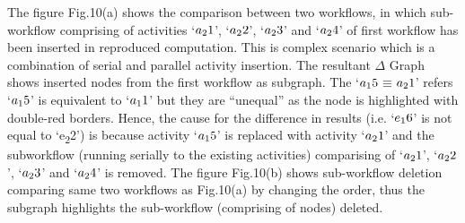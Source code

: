 \documentclass[10pt,conference,twocolumn]{IEEEtran}
\begin{document}
The figure Fig.10(a) shows the comparison between two workflows, in which sub-workflow comprising of activities `$a\textsubscript{2}1$', `$a\textsubscript{2}2$', `$a\textsubscript{2}3$' and `$a\textsubscript{2}4$' of first workflow has been inserted in reproduced computation. This is complex scenario which is a combination of serial and parallel activity insertion. The resultant $\Delta$ Graph shows inserted nodes from the first workflow as subgraph. The `$a\textsubscript{1}5$$\equiv$$a\textsubscript{2}1$' refers `$a\textsubscript{1}5$' is equivalent to `$a\textsubscript{1}1$' but they are \enquote{unequal} as the node is highlighted with double-red borders. Hence, the cause for the difference in results (i.e. `$e\textsubscript{1}6$' is not equal to  `e\textsubscript{2}2') is because activity `$a\textsubscript{1}5$'  is replaced with activity `$a\textsubscript{2}1$' and the subworkflow (running serially to the existing activities) comparising of `$a\textsubscript{2}1$', `$a\textsubscript{2}2$', `$a\textsubscript{2}3$' and `$a\textsubscript{2}4$' is removed. The figure Fig.10(b) shows sub-workflow deletion comparing same two workflows as Fig.10(a) by changing the order, thus the subgraph highlights the sub-workflow (comprising of nodes) deleted.
\end{document}
